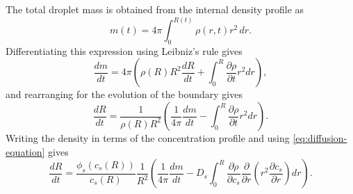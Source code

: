 \documentclass[12pt,twoside]{report}
\begin{document}
The total droplet mass is obtained from the internal density profile as
\begin{equation}\label{eq:mass-equation}
  m(t) = 4\pi \int_0^{R(t)} \rho(r,t) r^2 \, dr.
\end{equation}
Differentiating this expression using Leibniz's rule gives
\begin{equation}
  \frac{dm}{dt} = 4\pi \left(
  \rho(R) R^2 \frac{dR}{dt} + \int_0^R \frac{\partial \rho}{\partial t} r^2 dr
  \right),
\end{equation}
and rearranging for the evolution of the boundary gives
\begin{equation}
  \frac{dR}{dt} =
  \frac{1}{\rho(R) R^2} \left(
  \frac{1}{4\pi} \frac{dm}{dt} - \int_0^R \frac{\partial \rho}{\partial t} r^2 dr
  \right).
\end{equation}
Writing the density in terms of the concentration profile and using \eqref{eq:diffusion-equation} gives
\begin{equation}\label{eq:radial-evolution}
  \frac{dR}{dt} =
  \frac{\phi_s(c_s(R))}{c_s(R)} \frac{1}{R^2} \left(
  \frac{1}{4\pi} \frac{dm}{dt} -
  D_s \int_0^R
  \frac{\partial \rho}{\partial c_s}
  \frac{\partial}{\partial r} \left( r^2 \frac{\partial c_s}{\partial r} \right) dr
  \right).
\end{equation}

\end{document}
